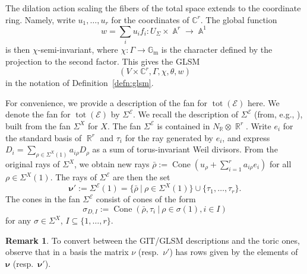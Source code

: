 \documentclass[reqno, 12pt]{amsart}
\theoremstyle{definition}
\newtheorem{remark}[theorem]{Remark}
\newcommand{\op}[1]{\operatorname{#1}}
\newcommand{\modmod}[1]{/ \! \! / \!_{#1}}
\def\R{\op{\mathbb{R}}}
\def\O{\op{\mathcal{O}}}
\def\A{\op{\mathbb{A}}}
\def\Gm{\op{\mathbb{G}_m}}
\def\tot{\op{tot}}
\numberwithin{equation}{section}
\begin{document}


The dilation action scaling the fibers of the total space extends to the coordinate ring.  Namely, write $u_1, \dots, u_r$ for the coordinates of $\mathbb C^r$. The global function 
$$
w = \sum_i u_if_i: U_{\Sigma} \times \A^r \to \A^1
$$
is then $\chi$-semi-invariant, where $\chi : \Gamma \to \Gm$ is the character defined by the projection to the second factor. This gives the GLSM 
$$
(V \times \mathbb C^r, \Gamma, \chi, \theta, w)
$$
in the notation of Definition~\ref{defn:glsm}.

For convenience, we provide a description of the fan for $\tot(\mathcal E)$ here.  We denote the fan for $\tot(\mathcal E)$ by $\Sigma^{\mathcal{E}}$.
We recall the description of $\Sigma^{\mathcal{E}}$ (from, e.g., \cite[.1]{CLS}), built from the fan $\Sigma^X$ for $X$.  The fan $\Sigma^{\mathcal{E}}$ is contained in $N_{\R} \otimes \R^r$. Write $e_i$ for the standard basis of $\R^r$ and $\tau_i$ for the ray generated by $e_i$, and express $D_i = \sum_{\rho\in \Sigma^X\!(1)} a_{i\rho}D_\rho$ as a sum of torus-invariant Weil divisors. From the original rays of $\Sigma^X$, we obtain new rays $\bar \rho := \op{Cone}(u_\rho + \sum_{i=1}^r a_{i\rho}e_i)$ for all $\rho \in \Sigma^X(1)$. The rays of $\Sigma^{\mathcal{E}}$ are then the set 
\[
\boldsymbol{\nu}' := \Sigma^{\mathcal E}(1) = \{ \bar \rho \ | \ \rho \in \Sigma^X(1)\} \cup \{\tau_1, \dots, \tau_r\}.
\]
The cones in the fan $\Sigma^{\mathcal{E}}$ consist of cones of the form
$$
\sigma_{D, I} := \op{Cone}(\bar \rho, \tau_i \ | \ \rho \in \sigma(1), i \in I)
$$
for any $\sigma \in \Sigma^X$, $I \subseteq \{1, \dots, r\}$. 

\begin{remark}
To convert between the GIT/GLSM descriptions and the toric ones, observe that in a basis the matrix $\nu$ (resp.\ $\nu'$) has rows given by the elements of $\boldsymbol{\nu}$ (resp.\ $\boldsymbol{\nu}'$).
\end{remark}
\end{document}
